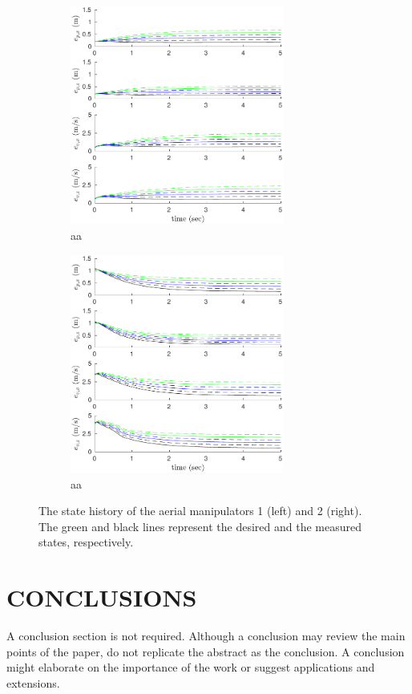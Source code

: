 \documentclass[letterpaper, 10 pt, conference]{ieeeconf}  %
\begin{document}
\begin{figure}[h]
\begin{subfigure}[b]{0.5\textwidth}
\centering
\includegraphics[width=7.0cm]{smaller.pdf}
\caption{aa}
\end{subfigure}
\begin{subfigure}[b]{0.5\textwidth}
\centering
\includegraphics[width=7.0cm]{bigger.pdf}
\caption{aa}
\end{subfigure}

\caption{
The state history of the aerial manipulators 1 (left) and 2 (right). The green and black lines represent the desired and the measured states, respectively.}
\label{fig:am1State}
\end{figure}



\section{CONCLUSIONS}

A conclusion section is not required. Although a conclusion may review the main points of the paper, do not replicate the abstract as the conclusion. A conclusion might elaborate on the importance of the work or suggest applications and extensions. 
\end{document}
